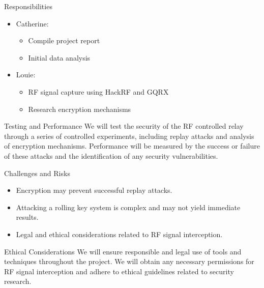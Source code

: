 \documentclass{beamer}
\begin{document}
\begin{frame}{Responsibilities}
\begin{itemize}
    \item Catherine:
    \begin{itemize}
        \item Compile project report
        \item Initial data analysis
    \end{itemize}
    \item Louie:
    \begin{itemize}
       \item RF signal capture using HackRF and GQRX
        \item Research encryption mechanisms
    \end{itemize}
\end{itemize}
\end{frame}

\begin{frame}{Testing and Performance}
We will test the security of the RF controlled relay through a series of controlled experiments, including replay attacks and analysis of encryption mechanisms. Performance will be measured by the success or failure of these attacks and the identification of any security vulnerabilities.
\end{frame}

\begin{frame}{Challenges and Risks}
\begin{itemize}
    \item Encryption may prevent successful replay attacks.
    \item Attacking a rolling key system is complex and may not yield immediate results.
    \item Legal and ethical considerations related to RF signal interception.
\end{itemize}
\end{frame}

\begin{frame}{Ethical Considerations}
We will ensure responsible and legal use of tools and techniques throughout the project. We will obtain any necessary permissions for RF signal interception and adhere to ethical guidelines related to security research.
\end{frame}
\end{document}

